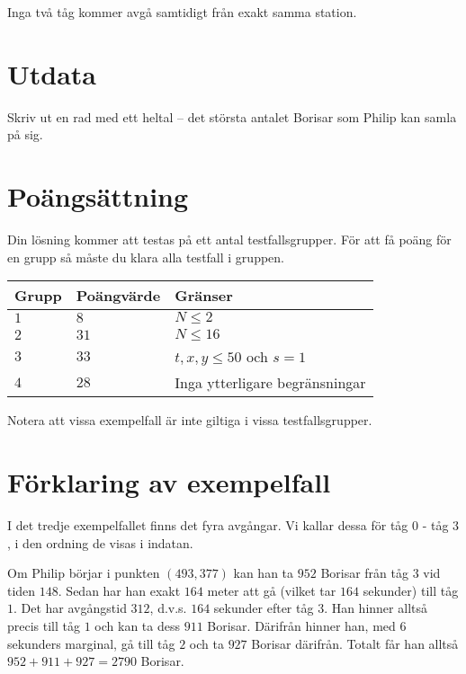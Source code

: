 Inga två tåg kommer avgå samtidigt från exakt samma station.

\section*{Utdata}
Skriv ut en rad med ett heltal -- det största antalet Borisar som Philip kan samla på sig.

\section*{Poängsättning}
Din lösning kommer att testas på ett antal testfallsgrupper.
För att få poäng för en grupp så måste du klara alla testfall i gruppen.

\noindent
\begin{tabular}{| l | l | l |}
  \hline
  Grupp & Poängvärde & Gränser \\ \hline
  $1$   & $8$        & $N \le 2$ \\ \hline
  $2$   & $31$       & $N \le 16$ \\ \hline
  $3$   & $33$       & $t,x,y\le 50$ och $s = 1$ \\ \hline
  $4$   & $28$       & Inga ytterligare begränsningar \\ \hline
\end{tabular}

Notera att vissa exempelfall är inte giltiga i vissa testfallsgrupper.

\section*{Förklaring av exempelfall}
I det tredje exempelfallet finns det fyra avgångar.
Vi kallar dessa för tåg $0$ - tåg $3$, i den ordning de visas i indatan.

Om Philip börjar i punkten $(493,377)$ kan han ta $952$ Borisar från tåg $3$ vid tiden $148$. Sedan har han exakt $164$ meter att gå (vilket tar $164$ sekunder) till tåg $1$. Det har avgångstid $312$, d.v.s. $164$ sekunder efter tåg $3$. 
Han hinner alltså precis till tåg $1$ och kan ta dess $911$ Borisar. Därifrån hinner han, med $6$ sekunders marginal, gå till tåg $2$ och ta $927$ Borisar därifrån. Totalt får han alltså $952+911+927=2790$ Borisar. 
